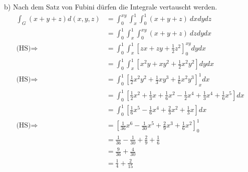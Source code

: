 \documentclass[10pt]{article}
\begin{document}
b) Nach dem Satz von Fubini dürfen die Integrale vertauscht werden.
\begin{align*}
	\int_G (x+y+z)d(x,y,z)
	&= \int_0^{xy} \int_x^1 \int_0^1 (x+y+z) \ dx dy dz  \\
	&= \int_0^1 \int_x^1  \int_0^{xy} (x+y+z) \ dz dy dx  \\
	\text{(HS)} \Rightarrow
	&= \int_0^1 \int_x^1 \left[zx + zy + \frac12 z^2 \right]_0^{xy} dy dx  \\
	&= \int_0^1 \int_x^1 \left[x^2y + xy^2 + \frac12 x^2y^2 \right] dy dx  \\
	\text{(HS)} \Rightarrow
	&= \int_0^1 \left[\frac12 x^2y^2 + \frac13 xy^3 + \frac16 x^2y^3 \right]_x^1  dx  \\
	&= \int_0^1 \left[\frac12 x^2 + \frac13 x + \frac16 x^2 
	- \frac12 x^4 + \frac13 x^4 + \frac16 x^5 \right]  dx  \\
	&= \int_0^1 \left[\frac16 x^5 - \frac16 x^4   + \frac23 x^2 + \frac13 x \right]  dx  \\
	\text{(HS)} \Rightarrow
	&= \left[\frac1{36} x^6 - \frac1{30} x^5   + \frac2{9} x^3 + \frac16 x^2 \right]_0^1 \\
	&= \frac1{36} - \frac1{30} + \frac2{9} + \frac16 \\
	&= \frac9{36} + \frac4{30} \\
	&= \frac14 + \frac2{15}
\end{align*}
\end{document}
